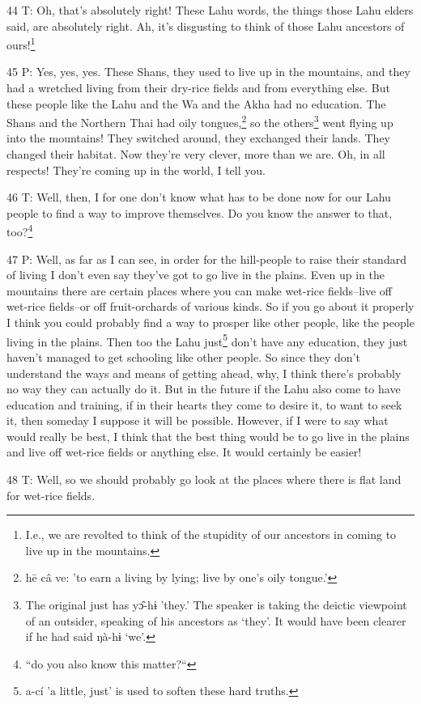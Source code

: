 44 T: Oh, that's absolutely right! These Lahu words, the things those Lahu elders
said, are absolutely right. Ah, it's disgusting to think of those Lahu ancestors
of ours!\footnote{I.e., we are revolted to think of the stupidity of our ancestors in coming to live up in the mountains.}

45 P: Yes, yes, yes. These Shans, they used to live up in the mountains, and they
had a wretched living from their dry-rice fields and from everything else. But
these people like the Lahu and the Wa and the Akha had no education. The Shans
and the Northern Thai had oily tongues,\footnote{hē câ ve: 'to earn a living by lying; live by one's oily tongue.'} so the others\footnote{The original just has yɔ̂-hɨ 'they.' The speaker is taking the deictic viewpoint of an outsider, speaking of his ancestors as `they'. It would have been clearer if he had said ŋà-hɨ `we'.} went flying up into
the mountains! They switched around, they exchanged their lands. They changed their
habitat. Now they're very clever, more than we are. Oh, in all respects! They're
coming up in the world, I tell you.

46 T: Well, then, I for one don't know what has to be done now for our Lahu people
to find a way to improve themselves. Do you know the answer to that, too?\footnote{``do you also know this matter?``}

47 P: Well, as far as I can see, in order for the hill-people to raise their standard
of living I don't even say they've got to go live in the plains. Even up in the
mountains there are certain places where you can make wet-rice fields--live off
wet-rice fields--or off fruit-orchards of various kinds. So if you go about it
properly I think you could probably find a way to prosper like other people, like
the people living in the plains. Then too the Lahu just\footnote{a-cí 'a little, just' is used to soften these hard truths.} don't have any education,
they just haven't managed to get schooling like other people. So since they don't
understand the ways and means of getting ahead, why, I think there's probably no
way they can actually do it. But in the future if the Lahu also come to have education
and training, if in their hearts they come to desire it, to want to seek it, then
someday I suppose it will be possible. However, if I were to say what would really
be best, I think that the best thing would be to go live in the plains and live
off wet-rice fields or anything else. It would certainly be easier!

48 T: Well, so we should probably go look at the places where there is flat land
for wet-rice fields.

